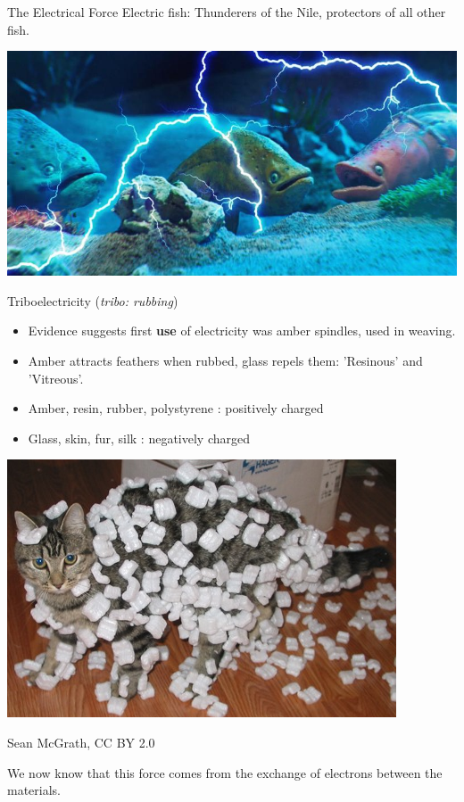 %  
\begin{frame}{The Electrical Force}
\small
Electric fish: Thunderers of the Nile,  protectors of all other fish.\\[1ex]

\begin{center}
\includegraphics[scale=0.3]{fish.jpg}
\end{center}
\end{frame}


\begin{frame}{Triboelectricity (\textit{tribo: rubbing})}
\small
\begin{itemize}
\item Evidence suggests first \textbf{ use} of electricity was amber spindles, used in weaving.
\item Amber attracts feathers when rubbed, glass repels them: 'Resinous' and 'Vitreous'.
\item Amber, resin, rubber, polystyrene : positively charged
\item Glass, skin, fur, silk : negatively charged
\end{itemize}
\begin{center}
\includegraphics[scale=1]{cat.jpg}
\end{center}
\tiny
Sean McGrath,  CC BY 2.0 

\small
We now know that this force comes from the exchange of electrons between the materials.
\end{frame}


